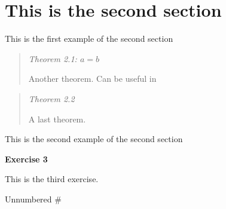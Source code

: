 \hypertarget{this-is-the-second-section}{%
\section{This is the second section}\label{this-is-the-second-section}}

\begin{description}
\tightlist
\item[\phantomsection\addcontentsline{example}{example}{\protect\numberline {2.1}{\ignorespaces {Example}}}\protect\hypertarget{example:this-is-the-second-section.1}{}{}\protect\hypertarget{example:2.1}{}{\label{example:2.1}\label{example:this-is-the-second-section.1}\textbf{Example
1}}]
This is the first example of the second section
\end{description}

\begin{quote}
\protect\hypertarget{theorem:this-is-the-second-section.a-b}{}{}\protect\hypertarget{theorem:2.1}{}{\label{theorem:2.1}\label{theorem:this-is-the-second-section.a-b}\emph{Theorem
2.1: \(a=b\)}}

Another theorem. Can be useful in \protect\hyperlink{exercise:1}{}
\end{quote}

\begin{quote}
\protect\hypertarget{theorem:this-is-the-second-section.2}{}{}\protect\hypertarget{theorem:2.2}{}{\label{theorem:2.2}\label{theorem:this-is-the-second-section.2}\emph{Theorem
2.2}}

A last theorem.
\end{quote}

\begin{description}
\tightlist
\item[\phantomsection\addcontentsline{example}{example}{\protect\numberline {2.2}{\ignorespaces {Example}}}\protect\hypertarget{example:this-is-the-second-section.2}{}{}\protect\hypertarget{example:2.2}{}{\label{example:2.2}\label{example:this-is-the-second-section.2}\textbf{Example
2}}]
This is the second example of the second section
\end{description}

\protect\hypertarget{exercise:3}{}{}\protect\hypertarget{exercise:last}{}{\label{exercise:last}\label{exercise:3}\textbf{Exercise
3}}

This is the third exercise.

Unnumbered \#
